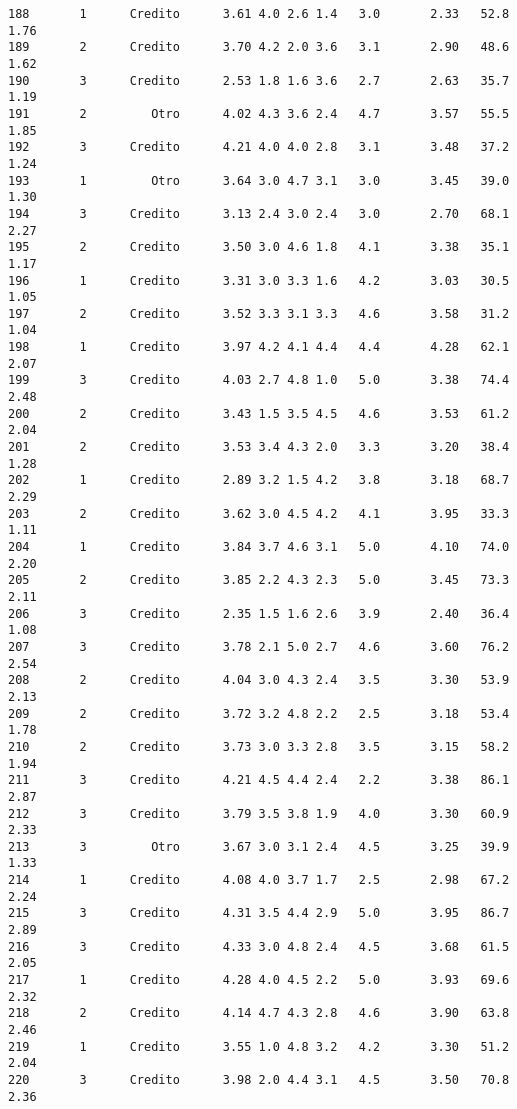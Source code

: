 \documentclass[
  letterpaper,
  DIV=11,
  numbers=noendperiod]{scrartcl}
\begin{document}
\begin{verbatim}
188       1      Credito      3.61 4.0 2.6 1.4   3.0       2.33   52.8    1.76
189       2      Credito      3.70 4.2 2.0 3.6   3.1       2.90   48.6    1.62
190       3      Credito      2.53 1.8 1.6 3.6   2.7       2.63   35.7    1.19
191       2         Otro      4.02 4.3 3.6 2.4   4.7       3.57   55.5    1.85
192       3      Credito      4.21 4.0 4.0 2.8   3.1       3.48   37.2    1.24
193       1         Otro      3.64 3.0 4.7 3.1   3.0       3.45   39.0    1.30
194       3      Credito      3.13 2.4 3.0 2.4   3.0       2.70   68.1    2.27
195       2      Credito      3.50 3.0 4.6 1.8   4.1       3.38   35.1    1.17
196       1      Credito      3.31 3.0 3.3 1.6   4.2       3.03   30.5    1.05
197       2      Credito      3.52 3.3 3.1 3.3   4.6       3.58   31.2    1.04
198       1      Credito      3.97 4.2 4.1 4.4   4.4       4.28   62.1    2.07
199       3      Credito      4.03 2.7 4.8 1.0   5.0       3.38   74.4    2.48
200       2      Credito      3.43 1.5 3.5 4.5   4.6       3.53   61.2    2.04
201       2      Credito      3.53 3.4 4.3 2.0   3.3       3.20   38.4    1.28
202       1      Credito      2.89 3.2 1.5 4.2   3.8       3.18   68.7    2.29
203       2      Credito      3.62 3.0 4.5 4.2   4.1       3.95   33.3    1.11
204       1      Credito      3.84 3.7 4.6 3.1   5.0       4.10   74.0    2.20
205       2      Credito      3.85 2.2 4.3 2.3   5.0       3.45   73.3    2.11
206       3      Credito      2.35 1.5 1.6 2.6   3.9       2.40   36.4    1.08
207       3      Credito      3.78 2.1 5.0 2.7   4.6       3.60   76.2    2.54
208       2      Credito      4.04 3.0 4.3 2.4   3.5       3.30   53.9    2.13
209       2      Credito      3.72 3.2 4.8 2.2   2.5       3.18   53.4    1.78
210       2      Credito      3.73 3.0 3.3 2.8   3.5       3.15   58.2    1.94
211       3      Credito      4.21 4.5 4.4 2.4   2.2       3.38   86.1    2.87
212       3      Credito      3.79 3.5 3.8 1.9   4.0       3.30   60.9    2.33
213       3         Otro      3.67 3.0 3.1 2.4   4.5       3.25   39.9    1.33
214       1      Credito      4.08 4.0 3.7 1.7   2.5       2.98   67.2    2.24
215       3      Credito      4.31 3.5 4.4 2.9   5.0       3.95   86.7    2.89
216       3      Credito      4.33 3.0 4.8 2.4   4.5       3.68   61.5    2.05
217       1      Credito      4.28 4.0 4.5 2.2   5.0       3.93   69.6    2.32
218       2      Credito      4.14 4.7 4.3 2.8   4.6       3.90   63.8    2.46
219       1      Credito      3.55 1.0 4.8 3.2   4.2       3.30   51.2    2.04
220       3      Credito      3.98 2.0 4.4 3.1   4.5       3.50   70.8    2.36

\end{verbatim}
\end{document}
